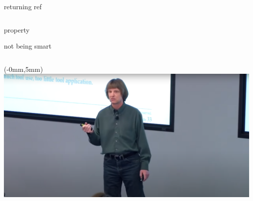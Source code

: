 \documentclass[aspectratio=169,notes]{beamer}
\begin{document}
	\begin{frame}[fragile]{returning ref}
		\begin{columns}[T]
		\begin{column}{0.49\textwidth}
		
		\end{column}
		\pause
		\begin{column}{0.49\textwidth}
		
		\end{column}
		\end{columns}
	\end{frame}

	\begin{frame}[fragile]{property}
		
	\end{frame}

	\begin{frame}[fragile]{not being smart}
		\begin{columns}[T]
		\begin{column}{0.49\textwidth}
		
		\end{column}
		\begin{column}{0.49\textwidth}
		
		\end{column}
		\end{columns}
	\end{frame}

	\begin{frame}[plain]
  		\begin{textblock*}{0cm}(-0mm,5mm)
		\hspace{-5mm}\includegraphics[width=\paperwidth]{scott.png}
		\end{textblock*}
	\end{frame}
\end{document}
